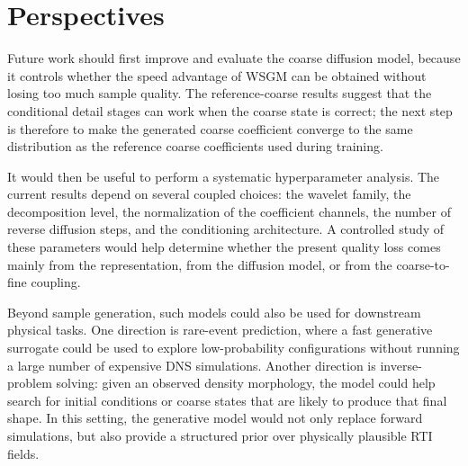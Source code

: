\section{Perspectives}

Future work should first improve and evaluate the coarse diffusion model,
because it controls whether the speed advantage of WSGM can be obtained without
losing too much sample quality. The reference-coarse results suggest that the
conditional detail stages can work when the coarse state is correct; the next
step is therefore to make the generated coarse coefficient converge to the same
distribution as the reference coarse coefficients used during training.

It would then be useful to perform a systematic hyperparameter analysis. The
current results depend on several coupled choices: the wavelet family, the
decomposition level, the normalization of the coefficient channels, the number
of reverse diffusion steps, and the conditioning architecture. A controlled
study of these parameters would help determine whether the present quality loss
comes mainly from the representation, from the diffusion model, or from the
coarse-to-fine coupling.

Beyond sample generation, such models could also be used for downstream
physical tasks. One direction is rare-event prediction, where a fast generative
surrogate could be used to explore low-probability configurations without
running a large number of expensive DNS simulations. Another direction is
inverse-problem solving: given an observed density morphology, the model could
help search for initial conditions or coarse states that are likely to produce
that final shape. In this setting, the generative model would not only replace
forward simulations, but also provide a structured prior over physically
plausible RTI fields.
